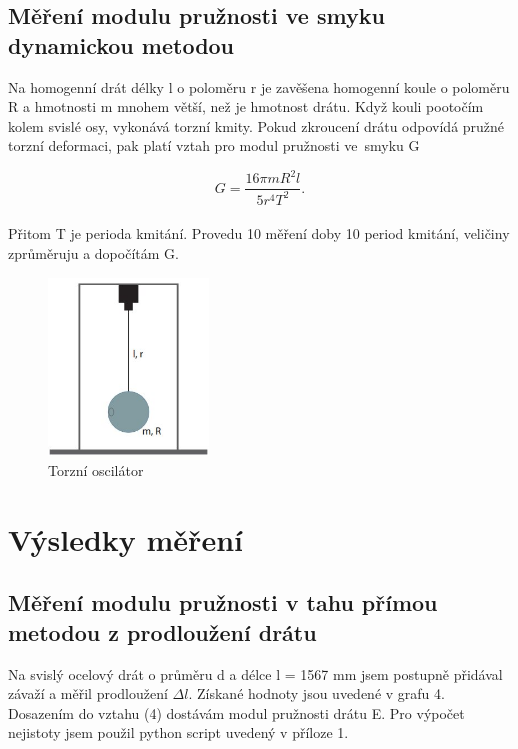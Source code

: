 \documentclass[a4paper,11pt]{article}
\begin{document}
\subsection{Měření modulu pružnosti ve smyku dynamickou metodou}

Na homogenní drát délky l o poloměru r je zavěšena homogenní koule o poloměru R a hmotnosti m mnohem větší, než je hmotnost drátu. Když kouli pootočím kolem svislé osy, vykonává torzní kmity. Pokud zkroucení drátu odpovídá pružné torzní deformaci, pak platí vztah pro modul pružnosti ve~smyku G

\begin{equation}
  G = \frac{16 \pi m R^2 l}{5 r^{4} T^{2}}.
\end{equation}
\\
Přitom T je perioda kmitání. Provedu 10 měření doby 10 period kmitání, veličiny zprůměruju a dopočítám G.

\begin{figure}[htpb]
  \centering
  \includegraphics[width=0.38\textwidth]{oscilator.jpg}
  \caption{Torzní oscilátor}
\end{figure}

\section{Výsledky měření}

\subsection{Měření modulu pružnosti v tahu přímou metodou z prodloužení drátu}

Na svislý ocelový drát o průměru d a délce l = 1567 mm jsem postupně přidával závaží a měřil prodloužení $\Delta l$. Získané hodnoty jsou uvedené v grafu 4. Dosazením do vztahu (4) dostávám modul pružnosti drátu E. Pro výpočet nejistoty jsem použil python script uvedený v příloze 1.

\captionsetup[figure]{name=Graf,justification=centering,format=plain}
\captionsetup[table]{name=Tabulka,justification=centering,format=plain}
\end{document}
